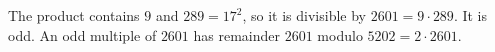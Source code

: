 The product contains $9$ and $289=17^2$, so it is divisible by $2601=9\cdot289$. It is odd. An odd multiple of $2601$ has remainder $\boxed{2601}$ modulo $5202=2\cdot2601$.
